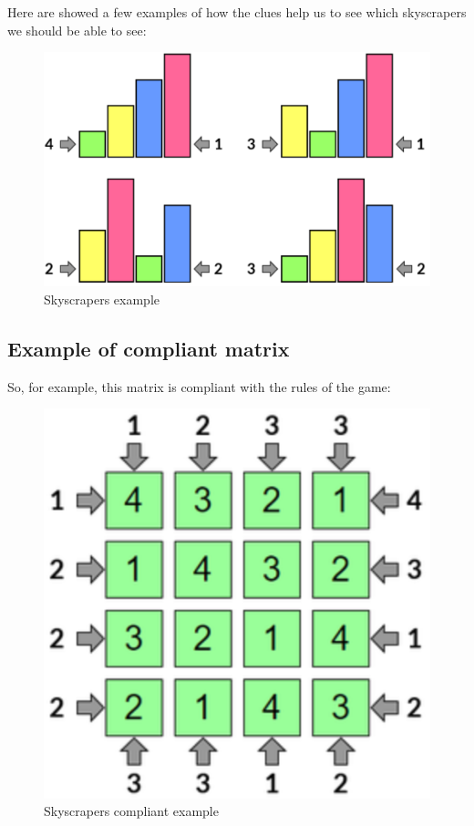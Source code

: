 \documentclass{article}
\begin{document}
Here are showed a few examples of how the clues help us to see which skyscrapers we should be able to see:\\

\begin{figure}[H]
  \centering
  \includegraphics[scale=0.6]{img/skyscrapers-example.png}
  \caption{Skyscrapers example}
\end{figure}

\pagebreak

\subsection{Example of compliant matrix}

So, for example, this matrix is compliant with the rules of the game:\\

\begin{figure}[H]
  \centering
  \includegraphics[scale=0.6]{img/skyscrapers-compliant.png}
  \caption{Skyscrapers compliant example}
\end{figure}
\end{document}
